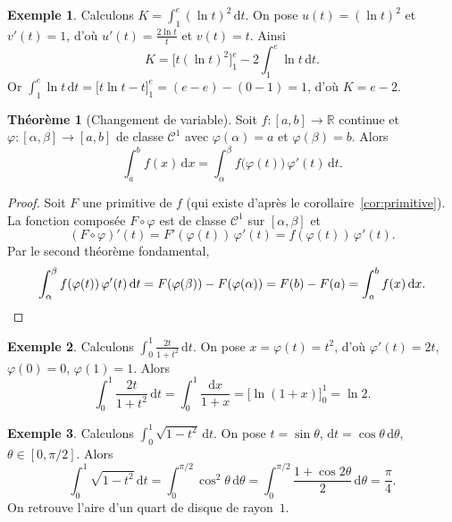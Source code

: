 \documentclass[12pt,a4paper,openany]{book}
\theoremstyle{definition}
\newtheorem{theoreme}{Théorème}[chapter]
\newtheorem{exemple}{Exemple}[chapter]
\newcommand{\R}{\mathbb{R}}
\newcommand{\dd}{\mathrm{d}}
\begin{document}
\begin{exemple}\label{ex:ipp3}
  Calculons $\displaystyle K = \int_1^e (\ln t)^2\,\dd t$.
  On pose $u(t) = (\ln t)^2$ et $v'(t) = 1$, d'où $u'(t) = \frac{2\ln t}{t}$ et $v(t) = t$. Ainsi
  \[
    K = \bigl[t(\ln t)^2\bigr]_1^e - 2\int_1^e \ln t\,\dd t.
  \]
  Or $\displaystyle\int_1^e \ln t\,\dd t = \bigl[t\ln t - t\bigr]_1^e = (e - e) - (0 - 1) = 1$, d'où $K = e - 2$.
\end{exemple}

\begin{theoreme}[Changement de variable]\label{thm:changement-variable}
  Soit $f \colon [a,b] \to \R$ continue et $\varphi \colon [\alpha, \beta] \to [a,b]$ de classe $\mathcal{C}^1$ avec $\varphi(\alpha) = a$ et $\varphi(\beta) = b$. Alors
  \[
    \int_a^b f(x)\,\dd x = \int_\alpha^\beta f\bigl(\varphi(t)\bigr)\,\varphi'(t)\,\dd t.
  \]
\end{theoreme}

\begin{proof}
  Soit $F$ une primitive de $f$ (qui existe d'après le corollaire~\ref{cor:primitive}). La fonction composée $F \circ \varphi$ est de classe $\mathcal{C}^1$ sur $[\alpha, \beta]$ et
  \[
    (F \circ \varphi)'(t) = F'(\varphi(t))\,\varphi'(t) = f(\varphi(t))\,\varphi'(t).
  \]
  Par le second théorème fondamental,
  \[
    \int_\alpha^\beta f(\varphi(t))\,\varphi'(t)\,\dd t = F(\varphi(\beta)) - F(\varphi(\alpha)) = F(b) - F(a) = \int_a^b f(x)\,\dd x. \qedhere
  \]
\end{proof}

\begin{exemple}\label{ex:cv1}
  Calculons $\displaystyle\int_0^1 \frac{2t}{1 + t^2}\,\dd t$.
  On pose $x = \varphi(t) = t^2$, d'où $\varphi'(t) = 2t$, $\varphi(0) = 0$, $\varphi(1) = 1$. Alors
  \[
    \int_0^1 \frac{2t}{1+t^2}\,\dd t = \int_0^1 \frac{\dd x}{1 + x} = \bigl[\ln(1+x)\bigr]_0^1 = \ln 2.
  \]
\end{exemple}

\begin{exemple}\label{ex:cv2}
  Calculons $\displaystyle\int_0^1 \sqrt{1 - t^2}\,\dd t$.
  On pose $t = \sin\theta$, $\dd t = \cos\theta\,\dd\theta$, $\theta \in [0, \pi/2]$. Alors
  \[
    \int_0^1 \sqrt{1-t^2}\,\dd t = \int_0^{\pi/2} \cos^2\theta\,\dd\theta = \int_0^{\pi/2}\frac{1 + \cos 2\theta}{2}\,\dd\theta = \frac{\pi}{4}.
  \]
  On retrouve l'aire d'un quart de disque de rayon~$1$.
\end{exemple}
\end{document}
